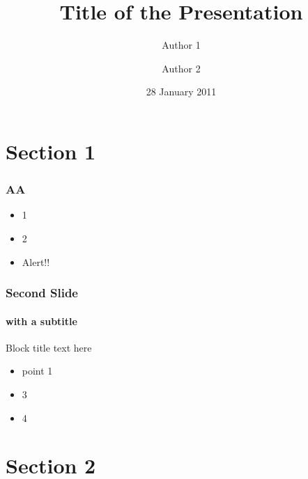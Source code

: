 \documentclass{beamer}
\title{Title of the Presentation}
\author[]{Author 1 \and Author 2}
\institute{%
  Department of Statistical Science \\ %
  University College London
}
\date{28 January 2011}
\begin{document}
\begin{frame}
  \frametitle{}
  \titlepage
\end{frame}

\section{Section 1}

\begin{frame}
  \frametitle{AA}
  \begin{itemize}
  \item 1
  \item 2
    \pause
  \item \alert{Alert!!}
  \end{itemize}
\end{frame}

\begin{frame}
  \frametitle{Second Slide}
  \framesubtitle{with a subtitle}
  \begin{block}{Block title}
    text here
    \begin{itemize}
    \item point 1
    \end{itemize}
  \end{block}
  \begin{itemize}
  \item 3
  \item 4 
  \end{itemize}
\end{frame}

\section{Section 2}

\end{document}
